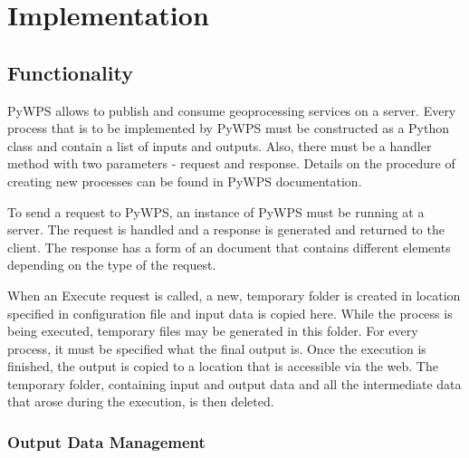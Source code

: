 \chapter{Implementation}
\label{4-practical}

\section{Functionality} 

PyWPS allows to publish and consume geoprocessing services on a
server. Every process that is to be implemented by PyWPS must be
constructed as a Python class and contain a list of inputs and outputs.
Also, there must be a handler method with two parameters - request and
response. \cite{pywpsprocess} Details on the procedure of creating new
processes can be found in PyWPS documentation.

To send a request to PyWPS, an instance of PyWPS must be running at a server.
The request is handled and a response is generated and returned
to the client. The response has a form of an  document that
contains different elements depending on the type of the request.

When an Execute request is called, a new, temporary folder is created
in location specified in configuration file and input data is copied
here. While the process is being executed, temporary files may be
generated in this folder. For every process, it must be specified what
the final output is. Once the execution is finished, the output is
copied to a location that is accessible via the web. The temporary
folder, containing input and output data and all the intermediate data
that arose during the execution, is then deleted.

\subsection{Output Data Management}


